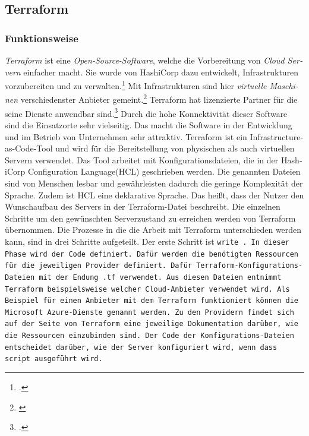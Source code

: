 \subsection{Terraform}
\begin{otherlanguage}{ngerman}
\subsubsection{Funktionsweise}
\textit{Terraform} ist eine \textit{Open-Source-Software}, welche die Vorbereitung von \textit{Cloud Servern} einfacher macht. Sie wurde von HashiCorp dazu entwickelt, Infrastrukturen vorzubereiten und zu verwalten.\footcite{introform} Mit Infrastrukturen sind hier \textit{virtuelle Maschinen} verschiedenster Anbieter gemeint.\footnote{\cite{Terraform}} Terraform hat lizenzierte Partner für die seine Dienste anwendbar sind.\footcite{TerraProviders} Durch die hohe Konnektivität dieser Software sind die Einsatzorte sehr vielseitig. Das macht die Software in der Entwicklung und im Betrieb von Unternehmen sehr attraktiv. 
\newline
\newline
Terraform ist ein Infrastructure-as-Code-Tool und wird für die Bereitstellung von physischen als auch virtuellen Servern verwendet. Das Tool arbeitet mit Konfigurationsdateien, die in der HashiCorp Configuration Language(HCL) geschrieben werden. Die genannten Dateien sind von Menschen lesbar und gewährleisten dadurch die geringe Komplexität der Sprache. Zudem ist HCL eine deklarative Sprache. Das heißt, dass der Nutzer den Wunschaufbau des Servers in der Terraform-Datei beschreibt. Die einzelnen Schritte um den gewünschten Serverzustand zu erreichen werden von Terraform übernommen. 
\newline
Die Prozesse in die die Arbeit mit Terraform unterschieden werden kann, sind in drei Schritte aufgeteilt. Der erste Schritt ist \tt write \rm. In dieser Phase wird der Code definiert. Dafür werden die benötigten Ressourcen für die jeweiligen Provider definiert. Dafür Terraform-Konfigurations-Dateien mit der Endung \tt .tf \rm verwendet. Aus diesen Dateien entnimmt Terraform beispielsweise welcher Cloud-Anbieter verwendet wird. Als Beispiel für einen Anbieter mit dem Terraform funktioniert können die Microsoft Azure-Dienste genannt werden. Zu den Providern findet sich auf der Seite von Terraform eine jeweilige Dokumentation darüber, wie die Ressourcen einzubinden sind. Der Code der Konfigurations-Dateien entscheidet darüber, wie der Server konfiguriert wird, wenn dass script ausgeführt wird. 

\end{otherlanguage}
